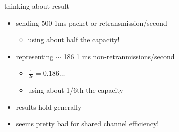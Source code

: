 \begin{frame}{thinking about result}
    \begin{itemize}
    \item sending 500 1ms packet or retransmission/second
        \begin{itemize}
        \item using about half the capacity!
        \end{itemize}
    \item representing $\sim$ 186 1 ms non-retranmissions/second
        \begin{itemize}
        \item $\frac{1}{2e} = 0.186\ldots$
        \item using about 1/6th the capacity
        \end{itemize}
    \vspace{.5cm}
    \item results hold generally
    \item seems pretty bad for shared channel efficiency!
    \end{itemize}
\end{frame}
